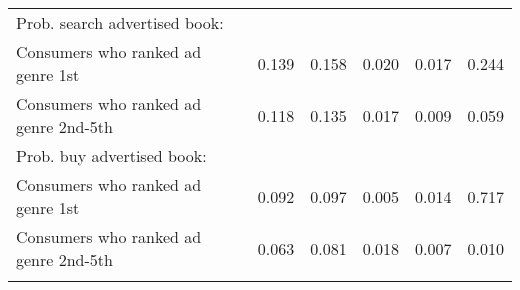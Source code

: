 \begin{center}
\begin{tabular}{lccccc}
\hspace{5pt} Prob. search advertised book: &  &  &  &  & \\
\hspace{5pt} Consumers who ranked ad genre 1st & 0.139 & 0.158 & 0.020 & 0.017 & 0.244\\
\hspace{5pt} Consumers who ranked ad genre 2nd-5th & 0.118 & 0.135 & 0.017 & 0.009 & 0.059\\
\hspace{5pt} Prob. buy advertised book: &  &  &  &  & \\
\hspace{5pt} Consumers who ranked ad genre 1st & 0.092 & 0.097 & 0.005 & 0.014 & 0.717\\
\hspace{5pt} Consumers who ranked ad genre 2nd-5th & 0.063 & 0.081 & 0.018 & 0.007 & 0.010\\
\noalign{\smallskip}\hline\end{tabular}\\
\end{center}
